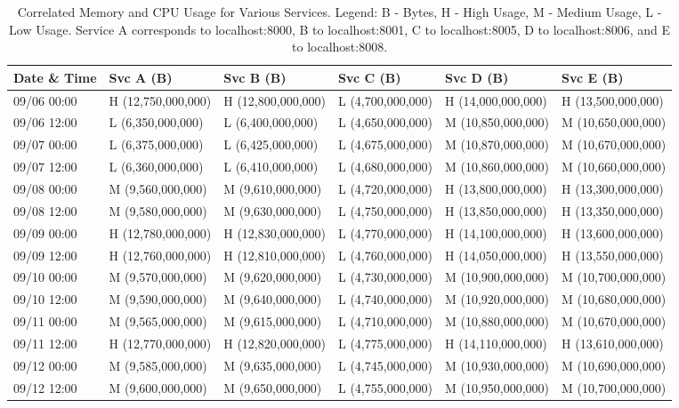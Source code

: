 \documentclass[preprint,12pt]{elsarticle}
\begin{document}
\begin{table}[h!]
  \centering
  \scriptsize %
  \setlength{\tabcolsep}{3pt} %
  \begin{tabular}{|l|l|l|l|l|l|}
  \hline
  \textbf{Date \& Time} & \textbf{Svc A (B)} & \textbf{Svc B (B)} & \textbf{Svc C (B)} & \textbf{Svc D (B)} & \textbf{Svc E (B)} \\ \hline
  09/06 00:00 & H (12,750,000,000) & H (12,800,000,000) & L (4,700,000,000) & H (14,000,000,000) & H (13,500,000,000) \\ \hline
  09/06 12:00 & L (6,350,000,000)  & L (6,400,000,000)  & L (4,650,000,000) & M (10,850,000,000) & M (10,650,000,000) \\ \hline
  09/07 00:00 & L (6,375,000,000)  & L (6,425,000,000)  & L (4,675,000,000) & M (10,870,000,000) & M (10,670,000,000) \\ \hline
  09/07 12:00 & L (6,360,000,000)  & L (6,410,000,000)  & L (4,680,000,000) & M (10,860,000,000) & M (10,660,000,000) \\ \hline
  09/08 00:00 & M (9,560,000,000)  & M (9,610,000,000)  & L (4,720,000,000) & H (13,800,000,000) & H (13,300,000,000) \\ \hline
  09/08 12:00 & M (9,580,000,000)  & M (9,630,000,000)  & L (4,750,000,000) & H (13,850,000,000) & H (13,350,000,000) \\ \hline
  09/09 00:00 & H (12,780,000,000) & H (12,830,000,000) & L (4,770,000,000) & H (14,100,000,000) & H (13,600,000,000) \\ \hline
  09/09 12:00 & H (12,760,000,000) & H (12,810,000,000) & L (4,760,000,000) & H (14,050,000,000) & H (13,550,000,000) \\ \hline
  09/10 00:00 & M (9,570,000,000)  & M (9,620,000,000)  & L (4,730,000,000) & M (10,900,000,000) & M (10,700,000,000) \\ \hline
  09/10 12:00 & M (9,590,000,000)  & M (9,640,000,000)  & L (4,740,000,000) & M (10,920,000,000) & M (10,680,000,000) \\ \hline
  09/11 00:00 & M (9,565,000,000)  & M (9,615,000,000)  & L (4,710,000,000) & M (10,880,000,000) & M (10,670,000,000) \\ \hline
  09/11 12:00 & H (12,770,000,000) & H (12,820,000,000) & L (4,775,000,000) & H (14,110,000,000) & H (13,610,000,000) \\ \hline
  09/12 00:00 & M (9,585,000,000)  & M (9,635,000,000)  & L (4,745,000,000) & M (10,930,000,000) & M (10,690,000,000) \\ \hline
  09/12 12:00 & M (9,600,000,000)  & M (9,650,000,000)  & L (4,755,000,000) & M (10,950,000,000) & M (10,700,000,000) \\ \hline
  \end{tabular}
  \caption{Correlated Memory and CPU Usage for Various Services. Legend: B - Bytes, H - High Usage, M - Medium Usage, L - Low Usage. Service A corresponds to localhost:8000, B to localhost:8001, C to localhost:8005, D to localhost:8006, and E to localhost:8008.}
  \label{table:memory-cpu-correlation}
\end{table}
\end{document}

